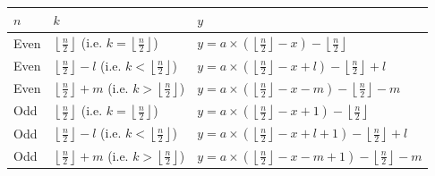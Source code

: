 \documentclass[10pt, twoside]{article}
\newcommand{\floordivision}[2]{\left\lfloor \frac{#1}{#2} \right\rfloor}
\begin{document}
\begin{tabular}{|l ||l ||l|}
	\hline
	\textbf{$n$} & \textbf{$k$} & \textbf{$y$} \\
	\hline
	\color{blue}
	Even & $\floordivision{n}{2}$ \space(i.e. $k = \floordivision{n}{2}$) & $y = a \times (\floordivision{n}{2}-x) - \floordivision{n}{2}$ \\
	\hline
	\color{blue}
	Even & $\floordivision{n}{2} - l$ \space(i.e. $k < \floordivision{n}{2}$) & $y = a \times (\floordivision{n}{2}-x+l ) - \floordivision{n}{2} + l$ \\
	\hline
	\color{blue}
	Even & $\floordivision{n}{2} + m $ (i.e. $k > \floordivision{n}{2}$) & $y = a \times (\floordivision{n}{2}-x-m ) - \floordivision{n}{2} -m$ \\
	\hline
	Odd & $\floordivision{n}{2} $ \space(i.e. $k = \floordivision{n}{2}$) & $y = a \times (\floordivision{n}{2}-x +1) - \floordivision{n}{2}$ \\
	\hline
	Odd & $\floordivision{n}{2} - l $ \space(i.e. $k < \floordivision{n}{2}$) & $y = a \times (\floordivision{n}{2}-x+l +1) - \floordivision{n}{2} + l$ \\
	\hline
	Odd & $\floordivision{n}{2} + m $ (i.e. $k > \floordivision{n}{2}$)  & $y = a \times (\floordivision{n}{2}-x-m +1 ) - \floordivision{n}{2} -m $ \\
	\hline
\end{tabular}
\end{document}
